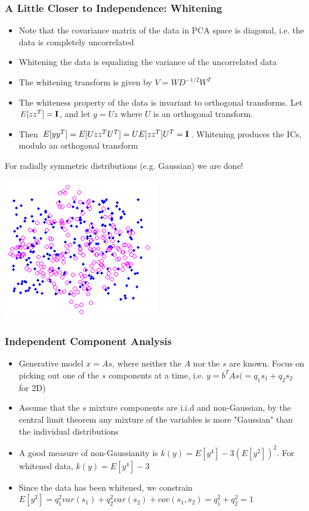 \documentclass{beamer}
\begin{document}
\begin{frame} 
\frametitle{A Little Closer to Independence: Whitening} 
\begin{itemize}
\item{Note that the covariance matrix of the data in PCA space is diagonal, i.e. the data is completely uncorrelated}
\item{Whitening the data is equalizing the variance of the uncorrelated data}  
\item{The whitening transform is given by $V = W D^{-1/2} W ^T$} 
\item{The whiteness property of the data is invariant to orthogonal transforms. Let $E[zz^T] = \bf I$, and let $y = Uz$ where $U$ is an orthogonal transform.} \item{Then $E[yy^T] = E[Uzz^T U^T] = U E[zz^T]U^T = \bf I$}. Whitening produces the ICs, modulo an orthogonal transform  
\end{itemize} 
For radially symmetric distributions (e.g. Gaussian) we are done! 
\begin{center}
\includegraphics[scale = 0.3]{white.png}
\end{center} 
\end{frame} 

\begin{frame} 
\frametitle{Independent Component Analysis} 
\begin{itemize} 
\item{Generative model $x=As$, where neither the $A$ nor the $s$ are known. Focus on picking out one of the $s$ components at a time, i.e. $ y  = b^T A s (= q_1 s_1 + q_2 s_2$ for 2D)} 
\item{Assume that the $s$ mixture components are i.i.d and non-Gaussian, by the central limit theorem any mixture of the variables is more "Gaussian" than the individual distributions}  
\item{A good measure of non-Gaussianity is $k(y) = E[y^4] - 3(E[y^2])^2$. For whitened data, $k(y) = E[y^4] - 3$}
\item{Since the data has been whitened, we constrain $E[y^2] = q_1 ^ 2 var(s_1) + q_2^2 var(s_2) + cov(s_1,s_2) = q_1 ^ 2 + q_2 ^2 = 1$}  
\end{itemize} 
\end{frame} 
\end{document}
